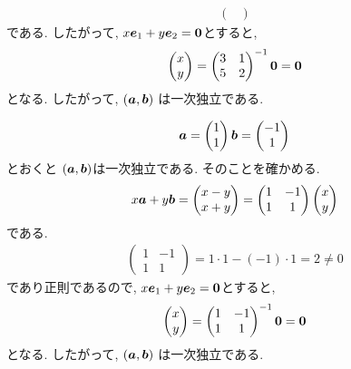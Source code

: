 \begin{example}
\begin{align*}
\begin{pmatrix}
    \end{pmatrix}
  \end{align*}
  である. したがって,
  $x\boldsymbol{e}_1+y\boldsymbol{e}_2=\boldsymbol{0}$とすると,
  \begin{align*}
    \begin{pmatrix}
      x\\y
    \end{pmatrix}
=
    \begin{pmatrix}
      3&1\\5&2
    \end{pmatrix}^{-1}\boldsymbol{0}=\boldsymbol{0}
  \end{align*}
  となる. 
  したがって, 
  $(\boldsymbol{a},\boldsymbol{b})$ は一次独立である.
\end{example}


\begin{example}
  \label{ex:linindep:3}
  \begin{align*}
    \boldsymbol{a}=\begin{pmatrix}1\\1\end{pmatrix}
    \boldsymbol{b}=\begin{pmatrix}-1\\1\end{pmatrix}
  \end{align*}
  とおくと
  $(\boldsymbol{a},\boldsymbol{b})$は一次独立である.
  そのことを確かめる.
  \begin{align*}
    x\boldsymbol{a}+y\boldsymbol{b}=
    \begin{pmatrix}
      x-y\\x+y
    \end{pmatrix}
    =
    \begin{pmatrix}
      1&-1\\1&1
    \end{pmatrix}
    \begin{pmatrix}
      x\\y
    \end{pmatrix}
  \end{align*}
  である.
  \begin{align*}
    \begin{pmatrix}
      1&-1\\1&1
    \end{pmatrix}
=1\cdot 1-(-1)\cdot 1=2\neq0
  \end{align*}
  であり正則であるので,
  $x\boldsymbol{e}_1+y\boldsymbol{e}_2=\boldsymbol{0}$とすると,
  \begin{align*}
    \begin{pmatrix}
      x\\y
    \end{pmatrix}
=
    \begin{pmatrix}
      1&-1\\1&1
    \end{pmatrix}^{-1}\boldsymbol{0}=\boldsymbol{0}
  \end{align*}
  となる. 
  したがって, 
  $(\boldsymbol{a},\boldsymbol{b})$ は一次独立である.
\end{example}

